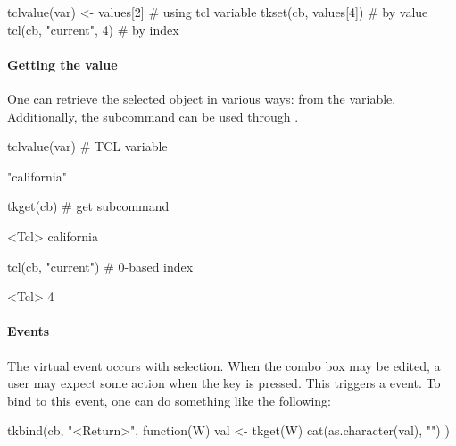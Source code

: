 \begin{Schunk}
\begin{Sinput}
 tclvalue(var) <- values[2]            # using tcl variable
 tkset(cb, values[4])                  # by value
 tcl(cb, "current", 4)                 # by index
\end{Sinput}
\end{Schunk}


\paragraph{Getting the value}
One can retrieve the selected object in various ways: from the \TCL\/
variable. Additionally, the  subcommand
can be used through .

\begin{Schunk}
\begin{Sinput}
 tclvalue(var)                           # TCL variable
\end{Sinput}
\begin{Soutput}
[1] "california"
\end{Soutput}
\begin{Sinput}
 tkget(cb)                               # get subcommand
\end{Sinput}
\begin{Soutput}
<Tcl> california 
\end{Soutput}
\begin{Sinput}
 tcl(cb, "current")                      # 0-based index
\end{Sinput}
\begin{Soutput}
<Tcl> 4 
\end{Soutput}
\end{Schunk}


\paragraph{Events}
The virtual event  occurs with
selection. When the combo box may be edited, a user may expect some
action when the  key is pressed. This triggers a
 event. To bind to this event, one can do something
like the following:

\begin{Schunk}
\begin{Sinput}
 tkbind(cb, "<Return>", function(W) {
   val <- tkget(W)
   cat(as.character(val), "\n")
 })
\end{Sinput}
\end{Schunk}

